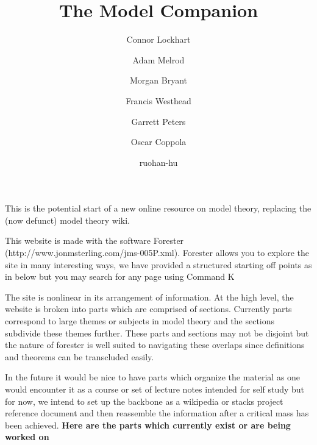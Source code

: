 \documentclass[a4paper]{article}
\title{The Model Companion}
\date{}
\author{Connor Lockhart \and Adam Melrod \and Morgan Bryant \and Francis Westhead \and Garrett Peters \and Oscar Coppola \and ruohan-hu}
\begin{document}
\maketitle
\par{This is the potential start of a new online resource on model theory, replacing the (now defunct) model theory wiki.}\par{This website is made with the software Forester (http://www.jonmsterling.com/jms-005P.xml). Forester allows you to explore the site in many interesting ways, we have provided a structured starting off points as in below but you may search for any page using Command K}\par{The site is nonlinear in its arrangement of information. At the high level, the website is broken into parts which are comprised of sections. Currently parts correspond to large themes or subjects in model theory and the sections subdivide these themes further. These parts and sections may not be disjoint but the nature of forester is well suited to navigating these overlaps since definitions and theorems can be transcluded easily. }\par{In the future it would be nice to have parts which organize the material as one would encounter it as a course or set of lecture notes intended for self study but for now, we intend to set up the backbone as a wikipedia or stacks project reference document and then reassemble the information after a critical mass has been achieved. }\textbf{Here are the parts which currently exist or are being worked on}
  
\end{document}
